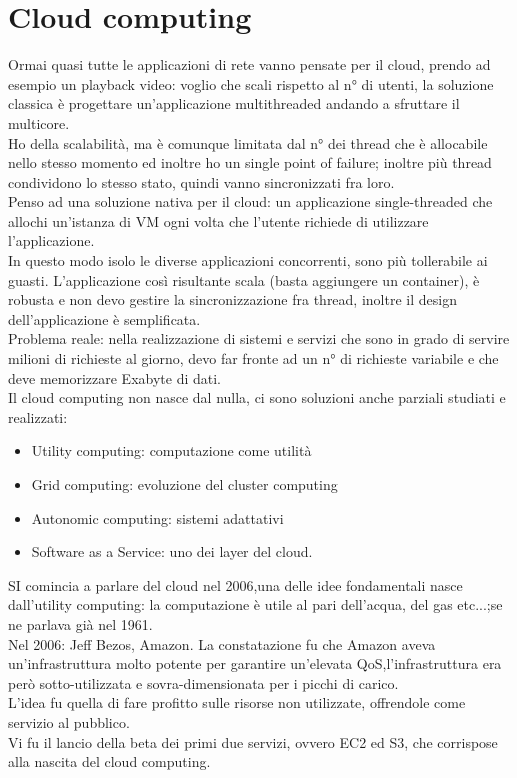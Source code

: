 \documentclass[16px]{article}
\begin{document}
\section{Cloud computing}
Ormai quasi tutte le applicazioni di rete vanno pensate per il cloud, prendo ad esempio un playback video: voglio che scali rispetto al n° di utenti, la soluzione classica è progettare un'applicazione multithreaded andando a sfruttare il multicore. \\ Ho della scalabilità, ma è comunque limitata dal n° dei thread che è allocabile nello stesso momento ed inoltre ho un single point of failure; inoltre più thread condividono lo stesso stato, quindi vanno sincronizzati fra loro.\\ Penso ad una soluzione nativa per il cloud: un applicazione single-threaded che allochi un'istanza di VM ogni volta che l'utente richiede di utilizzare l'applicazione.\\ In questo modo isolo le diverse applicazioni concorrenti, sono più tollerabile ai guasti. L'applicazione così risultante scala (basta aggiungere un container), è robusta e non devo gestire la sincronizzazione fra thread, inoltre il design dell'applicazione è semplificata.\\ Problema reale: nella realizzazione di sistemi e servizi che sono in grado di servire milioni di richieste al giorno, devo far fronte ad un n° di richieste variabile e che deve memorizzare Exabyte di dati.\\ Il cloud computing non nasce dal nulla, ci sono soluzioni anche parziali studiati e realizzati:
\begin{itemize}
\item Utility computing: computazione come utilità
\item Grid computing: evoluzione del cluster computing
\item Autonomic computing: sistemi adattativi
\item Software as a Service: uno dei layer del cloud.
\end{itemize}
SI comincia a parlare del cloud nel 2006,una delle idee fondamentali nasce dall'utility computing: la computazione è utile al pari dell'acqua, del gas etc...;se ne parlava già nel 1961.\\ Nel 2006: Jeff Bezos, Amazon. La constatazione fu che Amazon aveva un'infrastruttura molto potente per garantire un'elevata QoS,l'infrastruttura era però sotto-utilizzata e sovra-dimensionata per i picchi di carico.\\ L'idea fu quella di fare profitto sulle risorse non utilizzate, offrendole come servizio al pubblico.\\ Vi fu il lancio della beta dei primi due servizi, ovvero EC2 ed S3, che corrispose alla nascita del cloud computing.
\end{document}
